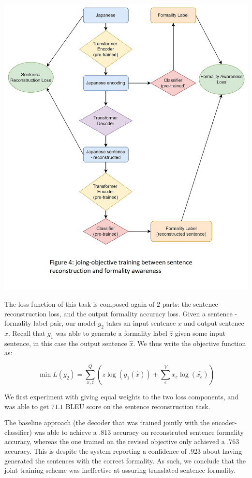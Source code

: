 \documentclass[11pt]{article}
\begin{document}
\includegraphics{images/joint_objective.jpg}

The loss function of this task is composed again of $2$ parts: the sentence reconstruction loss, and the output formality accuracy loss. Given a sentence - formality label pair, our model $g_2$ takes an input sentence $x$ and output sentence $\hat{x}$. Recall that $g_1$ was able to generate a formality label $\hat{z}$ given some input sentence, in this case the output sentence $\hat{x}$. We thus write the objective function as:

\begin{equation}
    \min{L(g_2)} = \sum_{x, z}^Q{(z \log{(g_1(\hat{x}))} + \sum_{e}^{V}{x_e \log{(\hat{x_e})}})}
\end{equation}

We first experiment with giving equal weights to the two loss components, and was able to get $71.1$ BLEU score on the sentence reconstruction task.

The baseline approach (the decoder that was trained jointly with the encoder-classifier) was able to achieve a $.813$ accuracy on reconstruted sentence formality accuracy, whereas the one trained on the revised objective only achieved a $.763$ accuracy. This is despite the system reporting a confidence of $.923$ about having generated the sentences with the correct formality. As such, we conclude that the joint training scheme was ineffective at assuring translated sentence formality.  
\end{document}
